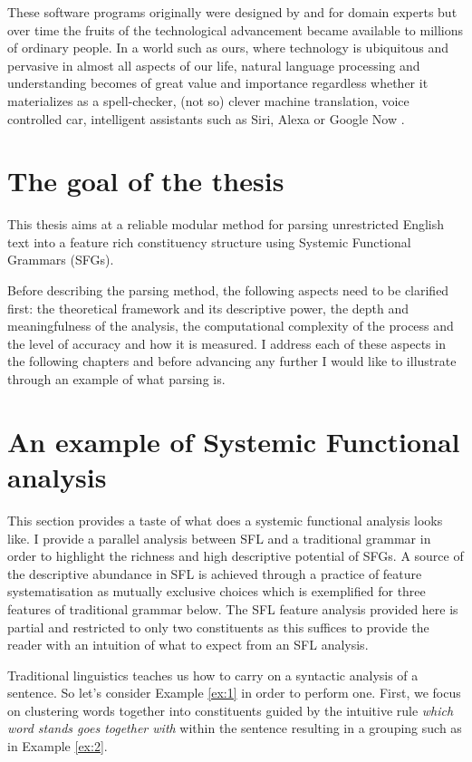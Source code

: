 These software programs originally were designed by and for domain experts but over time the fruits of the technological advancement became available to millions of ordinary people. In a world such as ours, where technology is ubiquitous and pervasive in almost all aspects of our life, natural language processing and understanding becomes of great value and importance regardless whether it materializes as a spell-checker, (not so) clever machine translation, voice controlled car, intelligent assistants such as Siri, Alexa or Google Now . 

\section{The goal of the thesis}
This thesis aims at a reliable modular method for parsing unrestricted English text into a feature rich constituency structure using Systemic Functional Grammars (SFGs).

Before describing the parsing method, the following aspects need to be clarified first: the theoretical framework and its descriptive power, the depth and meaningfulness of the analysis, the computational complexity of the process and the level of accuracy and how it is measured. I address each of these aspects in the following chapters and before advancing any further I would like to illustrate through an example of what parsing is. 

\section{An example of Systemic Functional analysis}
\label{sec:example}
This section provides a taste of what does a systemic functional analysis looks like. I provide a parallel analysis between SFL and a traditional grammar in order to highlight the richness and high descriptive potential of SFGs. A source of the descriptive abundance in SFL is achieved through a practice of feature systematisation as mutually exclusive choices which is exemplified for three features of traditional grammar below. The SFL feature analysis provided here is partial and restricted to only two constituents as this suffices to provide the reader with an intuition of what to expect from an SFL analysis. 

Traditional linguistics teaches us how to carry on a syntactic analysis of a sentence. So let's consider Example \ref{ex:1} in order to perform one. First, we focus on clustering words together into constituents guided by the intuitive rule \textit{which word stands goes together with} within the sentence resulting in a grouping such as in Example \ref{ex:2}. 

